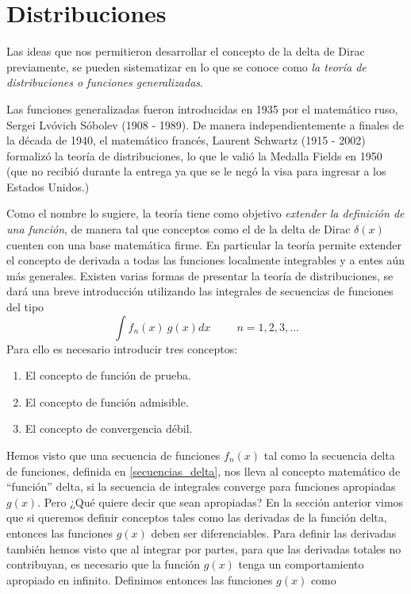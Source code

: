 \section{Distribuciones}
Las ideas que nos permitieron desarrollar el concepto de la delta de Dirac previamente, se pueden sistematizar en lo que se conoce como \emph{la teoría de distribuciones o funciones generalizadas}.
\par
Las funciones generalizadas fueron introducidas en 1935 por el matemático ruso, Sergei Lvóvich Sóbolev (1908 - 1989). De manera independientemente a finales de la década de 1940, el matemático francés, Laurent Schwartz (1915 - 2002) formalizó la teoría de distribuciones, lo que le valió la Medalla Fields en 1950 (que no recibió durante la entrega ya que se le negó la visa para ingresar a los Estados Unidos.)
\par
Como el nombre lo sugiere, la teoría tiene como objetivo  \emph{extender la definición de una función}, de manera tal que conceptos como el de la delta de Dirac $\delta (x)$ cuenten con una base matemática firme. En particular la teoría permite extender el concepto de derivada a todas las funciones localmente integrables y a entes aún más generales. Existen varias formas de presentar la teoría de distribuciones, se dará una breve introducción utilizando las integrales de secuencias de funciones del tipo
\begin{equation}
\int f_{n}(x) \: g(x) dx \hspace{1cm} n = 1, 2, 3 , \ldots
\label{eq:ecuacion_1_99}
\end{equation}
Para ello es necesario introducir tres conceptos:
\begin{enumerate}
\item El concepto de función de prueba.
\item El concepto de función admisible.
\item El concepto de convergencia débil.
\end{enumerate}
Hemos visto que una secuencia de funciones $f_{n}(x)$ tal como la secuencia delta de funciones, definida en \ref{secuencias_delta}, nos lleva al concepto matemático de \enquote{función} delta, si la secuencia de integrales converge para funciones apropiadas $g(x)$. Pero ¿Qué quiere decir que sean apropiadas? En la sección anterior vimos que si queremos definir conceptos tales como las derivadas de la función delta, entonces las funciones $g(x)$ deben ser diferenciables. Para definir las derivadas también hemos visto que al integrar por partes, para que las derivadas totales no contribuyan, es necesario que la función $g(x)$ tenga un comportamiento apropiado en infinito. Definimos entonces las funciones $g(x)$ como
